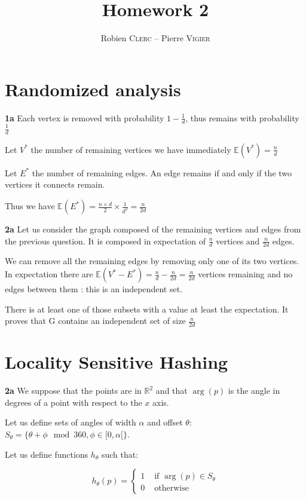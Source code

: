 \documentclass[10pt,a4paper]{article}
\title{Homework 2}
\author{Robien \textsc{Clerc} -- Pierre \textsc{Vigier}}
\theoremstyle{plain}
\begin{document}
\maketitle

\section{Randomized analysis}

\textbf{1a} Each vertex is removed with probability $1 - \frac{1}{d}$, thus remains with probability $\frac{1}{d}$

Let $V^*$ the number of remaining vertices we have immediately $\mathbb{E}(V^*) = \frac{n}{d}$

Let $E^*$ the number of remaining edges. An edge remains if and only if the two vertices it connects remain.

Thus we have $\mathbb{E}(E^*) = \frac{n \times d}{2} \times \frac{1}{d^2} = \frac{n}{2d}$

\textbf{2a} Let us consider the graph composed of the remaining vertices and edges from the previous question. It is composed in expectation of $\frac{n}{d}$ vertices and $\frac{n}{2d}$ edges.

We can remove all the remaining edges by removing only one of its two vertices. In expectation there are $\mathbb{E}(V^* - E^*) = \frac{n}{d} - \frac{n}{2d} = \frac{n}{2d}$ vertices remaining and no edges between them : this is an independent set.

There is at least one of those subsets with a value at least the expectation. It proves that G contains an independent set of size $\frac{n}{2d}$

\section{Locality Sensitive Hashing}

\textbf{2a} We suppose that the points are in $\mathbb{R}^2$ and that $\arg(p)$ is the angle in degrees of a point with respect to the $x$ axis.

Let us define sets of angles of width $\alpha$ and offset $\theta$: $S_{\theta} = \{ \theta + \phi \mod 360, \phi \in [0, \alpha[ \}$.

Let us define functions $h_{\theta}$ such that:

$$
h_{\theta}(p) = \left\{\begin{array}{ll}
1 & \text{ if } \arg(p) \in S_{\theta} \\
0 & \text{ otherwise}
\end{array}\right.
$$
\end{document}
